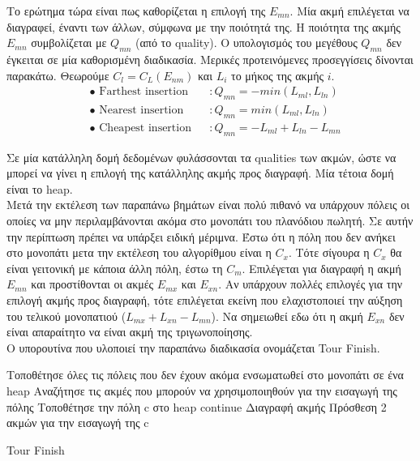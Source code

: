 \documentclass[oneside,12pt]{book}
\theoremstyle{definition}
\begin{document}
Το ερώτημα τώρα είναι πως καθορίζεται η επιλογή της \(E_{mn}\). Μία ακμή επιλέγεται να διαγραφεί, έναντι των άλλων, σύμφωνα με την ποιότητά της. Η ποιότητα της ακμής \(E_{mn}\) συμβολίζεται με \(Q_{mn}\) (από το quality). Ο υπολογισμός του μεγέθους \(Q_{mn}\) δεν έγκειται σε μία καθορισμένη διαδικασία. Μερικές προτεινόμενες προσεγγίσεις δίνονται παρακάτω. Θεωρούμε \(C_l = C_L(E_{nm})\) και \(L_i\) το μήκος της ακμής \(i\). \\

\begin{align*}
	& \bullet \text{ Farthest insertion} &&: Q_{mn} = - min(L_{ml}, L_{ln}) \\
	& \bullet \text{ Nearest insertion} &&: Q_{mn} = min(L_{ml}, L_{ln}) \\
	& \bullet \text{ Cheapest insertion} &&: Q_{mn} = -L_{ml} + L_{ln} - L_{mn} 
\end{align*}  

Σε μία κατάλληλη δομή δεδομένων φυλάσσονται τα qualities των ακμών, ώστε να μπορεί να γίνει η επιλογή της κατάλληλης ακμής προς διαγραφή. Μία τέτοια δομή είναι το heap. \\

Μετά την εκτέλεση των παραπάνω βημάτων είναι πολύ πιθανό να υπάρχουν πόλεις οι οποίες να μην περιλαμβάνονται ακόμα στο μονοπάτι του πλανόδιου πωλητή. Σε αυτήν την περίπτωση πρέπει να υπάρξει ειδική μέριμνα. Έστω ότι η πόλη που δεν ανήκει στο μονοπάτι μετα την εκτέλεση του αλγορίθμου είναι η \(C_x\). Τότε σίγουρα η \(C_x\) θα είναι γειτονική με κάποια άλλη πόλη, έστω τη \(C_m\). Επιλέγεται για διαγραφή η ακμή \(E_{mn}\) και προστίθονται οι ακμές \(E_{mx}\) και \(E_{xn}\). Αν υπάρχουν πολλές επιλογές για την επιλογή ακμής προς διαγραφή, τότε επιλέγεται εκείνη που ελαχιστοποιεί την αύξηση του τελικού μονοπατιού (\(L_{mx} + L_{xn} - L_{mn}\)). Να σημειωθεί εδω ότι η ακμή \(E_{xn}\) δεν είναι απαραίτητο να είναι ακμή της τριγωνοποίησης. \\

Ο υπορουτίνα που υλοποιεί την παραπάνω διαδικασία ονομάζεται Tour Finish. \\

\begin{algorithm}[H]
	\SetAlgoLined
	
	Τοποθέτησε όλες τις πόλεις που δεν έχουν ακόμα ενσωματωθεί στο μονοπάτι σε ένα heap \;
	{Αναζήτησε τις ακμές που μπορούν να χρησιμοποιηθούν για την εισαγωγή της πόλης \;
	{Τοποθέτησε την πόλη c στο heap \;
	continue \;}
	Διαγραφή ακμής \;
	Πρόσθεση 2 ακμών για την εισαγωγή της c \;}
	
	\caption{Tour Finish}
\end{algorithm}
\end{document}
